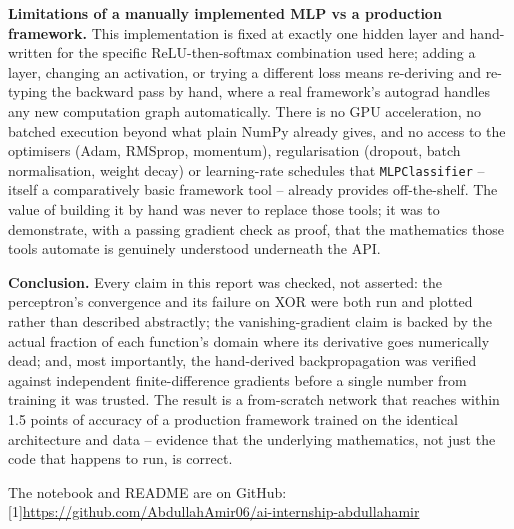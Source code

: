 \documentclass[11pt,a4paper]{article}
\begin{document}
\textbf{Limitations of a manually implemented MLP vs a production framework.} This
implementation is fixed at exactly one hidden layer and hand-written for the specific
ReLU-then-softmax combination used here; adding a layer, changing an activation, or
trying a different loss means re-deriving and re-typing the backward pass by hand,
where a real framework's autograd handles any new computation graph automatically.
There is no GPU acceleration, no batched execution beyond what plain NumPy already
gives, and no access to the optimisers (Adam, RMSprop, momentum), regularisation
(dropout, batch normalisation, weight decay) or learning-rate schedules that
\texttt{MLPClassifier} -- itself a comparatively basic framework tool -- already
provides off-the-shelf. The value of building it by hand was never to replace those
tools; it was to demonstrate, with a passing gradient check as proof, that the
mathematics those tools automate is genuinely understood underneath the API.

\textbf{Conclusion.} Every claim in this report was checked, not asserted: the
perceptron's convergence and its failure on XOR were both run and plotted rather than
described abstractly; the vanishing-gradient claim is backed by the actual fraction of
each function's domain where its derivative goes numerically dead; and, most
importantly, the hand-derived backpropagation was verified against independent
finite-difference gradients before a single number from training it was trusted. The
result is a from-scratch network that reaches within 1.5 points of accuracy of a
production framework trained on the identical architecture and data -- evidence that
the underlying mathematics, not just the code that happens to run, is correct.

\vspace{0.4cm}
\noindent The notebook and README are on GitHub: {\small\scalebox{0.72}[1]{\url{https://github.com/AbdullahAmir06/ai-internship-abdullahamir}}}
\end{document}

